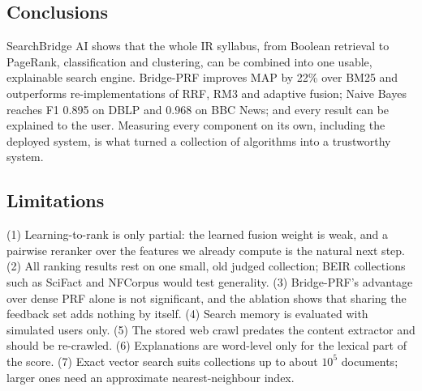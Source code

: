 \documentclass[conference]{IEEEtran}
\begin{document}
\subsection{Conclusions}
SearchBridge AI shows that the whole IR syllabus, from Boolean retrieval to PageRank, classification and clustering, can be combined into one usable, explainable search engine. Bridge-PRF improves MAP by 22\% over BM25 and outperforms re-implementations of RRF, RM3 and adaptive fusion; Naive Bayes reaches F1 0.895 on DBLP and 0.968 on BBC News; and every result can be explained to the user. Measuring every component on its own, including the deployed system, is what turned a collection of algorithms into a trustworthy system.

\subsection{Limitations}
(1) Learning-to-rank is only partial: the learned fusion weight is weak, and a pairwise reranker over the features we already compute is the natural next step. (2) All ranking results rest on one small, old judged collection; BEIR collections such as SciFact and NFCorpus would test generality. (3) Bridge-PRF's advantage over dense PRF alone is not significant, and the ablation shows that sharing the feedback set adds nothing by itself. (4) Search memory is evaluated with simulated users only. (5) The stored web crawl predates the content extractor and should be re-crawled. (6) Explanations are word-level only for the lexical part of the score. (7) Exact vector search suits collections up to about $10^5$ documents; larger ones need an approximate nearest-neighbour index.
\end{document}
